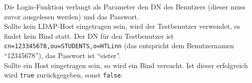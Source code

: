 \newpage

Die Login-Funktion verlangt als Parameter den DN des Benutzers (dieser muss zuvor ausgelesen werden) und das Passwort.\\
Sollte kein LDAP-Host eingetragen sein, wird der Testbenutzer verwendet, es findet kein Bind statt. Der DN für den Testbenutzer ist \texttt{cn=123345678,ou=STUDENTS,o=HTLinn} (das entspricht dem Benutzernamen \enquote{12345678}), das Passwort ist \enquote{sister}.\\
Sollte ein Host eingetragen sein, so wird ein Bind versucht. Ist dieser erfolgreich wird \texttt{true} zurückgegeben, sonst \texttt{false}.